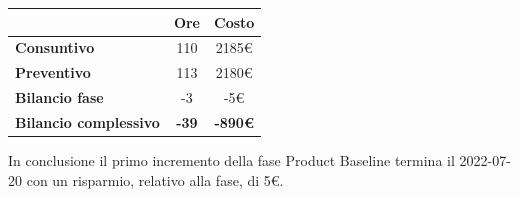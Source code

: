 \begin{center}
	\renewcommand{\arraystretch}{1.8}
	\begin{tabular}{ | l |c|c| }
    \hline
    & \textbf{Ore} & \textbf{Costo} \\
	\hline
    \textbf{Consuntivo} & 110 & 2185\euro \\
    \hline
    \textbf{Preventivo} & 113 & 2180\euro \\
    \hline
    \textbf{Bilancio fase} & -3 & -5\euro \\
    \hline
    \textbf{Bilancio complessivo} & \textbf{-39} & \textbf{-890\euro} \\
    \hline
    \end{tabular}
\end{center}
In conclusione il primo incremento della fase Product Baseline termina il 2022-07-20 con un risparmio, relativo
alla fase, di 5€.

